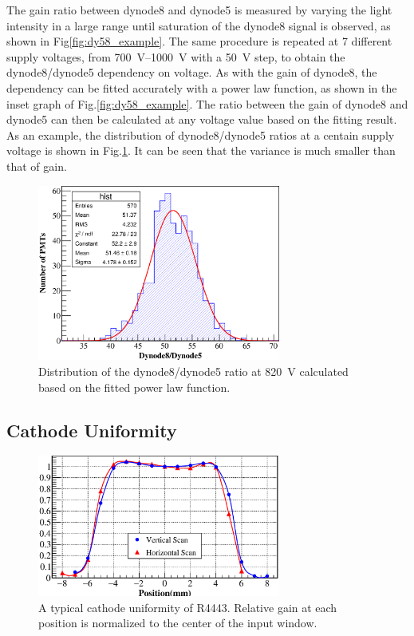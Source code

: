 \documentclass[review, times]{elsarticle}
\begin{document}
The gain ratio between dynode8 and dynode5 is measured by varying the light intensity in a large range until saturation of the dynode8 signal is observed, as shown in Fig\ref{fig:dy58_example}.
The same procedure is repeated at 7 different supply voltages, from \SIrange{700}{1000}{\volt} with a \SI{50}{\volt} step, to obtain the dynode8/dynode5 dependency on voltage.
As with the gain of dynode8, the dependency can be fitted accurately with a power law function, as shown in the inset graph of Fig.\ref{fig:dy58_example}.
The ratio between the gain of dynode8 and dynode5 can then be calculated at any voltage value based on the fitting result.
As an example, the distribution of dynode8/dynode5 ratios at a centain supply voltage is shown in Fig.\ref{fig:dy58_dist}.
It can be seen that the variance is much smaller than that of gain.

\begin{figure}
 \centering
 \includegraphics[width=80mm]{dy58_dist}
\caption{Distribution of the dynode8/dynode5 ratio at \SI{820}{\volt} calculated based on the fitted power law function.}
\label{fig:dy58_dist}
\end{figure} 

\subsection{Cathode Uniformity}
\label{sec:psd_cathodescan}

\begin{figure}
 \centering
 \includegraphics[width=80mm]{cathode_uniformity}
\caption{A typical cathode uniformity of R4443.
Relative gain at each position is normalized to the center of the input window.}
\label{fig:cathode_uniformity}
\end{figure} 
\end{document}
